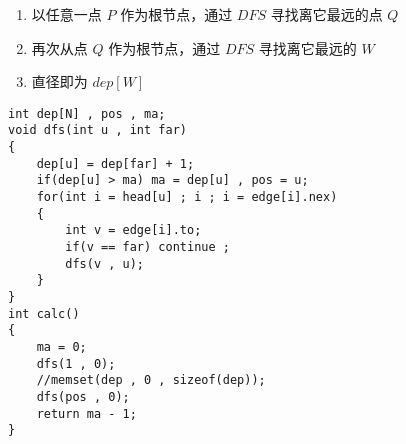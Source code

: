 \documentclass[E:/GsjzTle/main/main.tex]{subfiles}
\begin{document}
\begin{enumerate}
\def\labelenumi{\arabic{enumi}.}
\item
  以任意一点 \(P\) 作为根节点，通过 \(DFS\) 寻找离它最远的点 \(Q\)
\item
  再次从点 \(Q\) 作为根节点，通过 \(DFS\) 寻找离它最远的 \(W\)
\item
  直径即为 \(dep[W]\)
\end{enumerate}

\begin{lstlisting}
int dep[N] , pos , ma;
void dfs(int u , int far)
{
	dep[u] = dep[far] + 1;
	if(dep[u] > ma) ma = dep[u] , pos = u;
	for(int i = head[u] ; i ; i = edge[i].nex)
	{
		int v = edge[i].to;
		if(v == far) continue ;
		dfs(v , u);
	}
}
int calc()
{
	ma = 0;
	dfs(1 , 0); 
	//memset(dep , 0 , sizeof(dep)); 
	dfs(pos , 0);
	return ma - 1;
}
\end{lstlisting}
\end{document}
